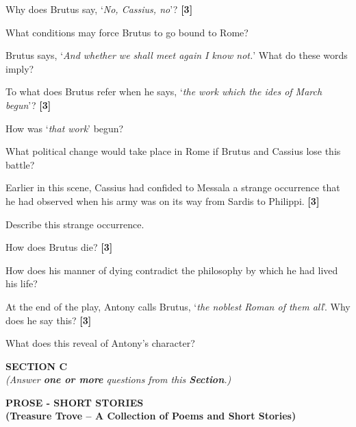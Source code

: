 \documentclass[12pt,a4paper]{article}
\newcommand{\qmarks}[1]{\hfill\textbf{[#1]}}
\begin{document}
\begin{romanenum}
    \item Why does Brutus say, `\textit{No, Cassius, no}'? \qmarks{3}

    What conditions may force Brutus to go bound to Rome?

    Brutus says, `\textit{And whether we shall meet again I know not.}' What do these words imply?

    \item To what does Brutus refer when he says, `\textit{the work which the ides of March begun}'? \qmarks{3}

    How was `\textit{that work}' begun?

    What political change would take place in Rome if Brutus and Cassius lose this battle?

    \item Earlier in this scene, Cassius had confided to Messala a strange occurrence that he had observed when his army was on its way from Sardis to Philippi. \qmarks{3}

    Describe this strange occurrence.

    \item How does Brutus die? \qmarks{3}

    How does his manner of dying contradict the philosophy by which he had lived his life?

    \item At the end of the play, Antony calls Brutus, `\textit{the noblest Roman of them all}'. Why does he say this? \qmarks{3}

    What does this reveal of Antony's character?
\end{romanenum}

\newpage

\begin{center}
    {\large\bfseries SECTION C}\\[2pt]
    \textit{(Answer \textbf{one or more} questions from this \textbf{Section}.)}
\end{center}

\vspace{4pt}
\begin{center}
    {\large\bfseries PROSE - SHORT STORIES}\\[2pt]
    \textbf{(Treasure Trove -- A Collection of Poems and Short Stories)}
\end{center}
\end{document}
